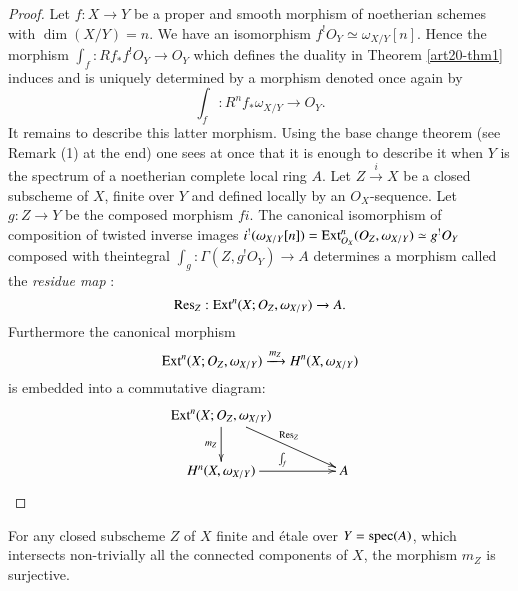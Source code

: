 \begin{proof}
Let $f:X\to Y$ be a proper and smooth morphism of noetherian schemes with $\dim(X/Y)=n$. We have an isomorphism $f^{!}O_{Y}\simeq \omega_{X/Y}[n]$. Hence the morphism $\int_{f}:Rf_{*}f^{!}O_{Y}\to O_{Y}$ which defines the duality in Theorem \ref{art20-thm1} induces and is uniquely determined by a morphism denoted once again by
$$
\int_{f}:R^{n}f_{*}\omega_{X/Y}\to O_{Y}.
$$
It remains to describe this latter morphism. Using the base change theorem (see Remark (1) at the end) one sees at once that it is enough to describe it when $Y$ is the spectrum of a noetherian complete local ring $A$. Let $Z\xrightarrow{i}X$ be a closed subscheme of $X$, finite over $Y$ and defined locally by an $O_{X}$-sequence. Let $g:Z\to Y$ be the composed morphism $fi$. The canonical isomorphism of composition of twisted inverse images $i^{!}(\omega_{X/Y}[n])=\operatorname{\mathrm{Ext}}_{O_{X}}^{n}(O_{Z},\omega_{X/Y})\simeq g^{!}O_{Y}$ composed with the\pageoriginale integral $\int_{g}:\Gamma(Z,g^{!}O_{Y})\to A$ determines a morphism called the {\em residue map} :
$$
\operatorname{\mathrm{Res}}_{Z}:\operatorname{\mathrm{Ext}}^{n}(X;O_{Z},\omega_{X/Y})\to A.
$$
Furthermore the canonical morphism
$$
\operatorname{\mathrm{Ext}}^{n}(X;O_{Z},\omega_{X/Y})\xrightarrow{m_{Z}}H^{n}(X,\omega_{X/Y})
$$
is embedded into a commutative diagram:
\[
\xymatrix@C=1.5cm{
\Ext^{n}(X;O_{Z},\omega_{X/Y})\ar[d]_-{m_{Z}}\ar[dr]^{\Res_{Z}} & \\
H^{n}(X,\omega_{X/Y})\ar[r]^{\int_{f}} & A
}
\]
\end{proof}

\begin{proposition}\label{art20-prop2}
For any closed subscheme $Z$ of $X$ finite and \'etale over $Y=\operatorname{\mathrm{spec}} (A)$, which intersects non-trivially all the connected components of $X$, the morphism $m_{Z}$ is surjective.
\end{proposition}

